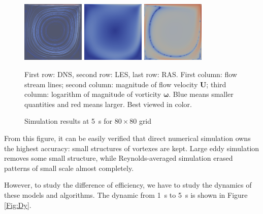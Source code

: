 \documentclass[english, nochinese]{pkupaper}
\begin{document}
\begin{figure}
{{
\includegraphics[width=3cm]{Results/Figure01h.pdf}
\includegraphics[width=3cm]{Results/Figure01g.pdf}
\includegraphics[width=3cm]{Results/Figure02o.pdf}
}
\caption{Simulation results at \SI{5}{s} for $ 80 \times 80 $ grid}
\label{Fig:Over}
}
{
\footnotesize
First row: DNS, second row: LES, last row: RAS. First column: flow stream lines; second column: magnitude of flow velocity $\mathbf{U}$; third column: logarithm of magnitude of vorticity $\bm{\omega}$. Blue means smaller quantities and red means larger. Best viewed in color.
}
\end{figure}

From this figure, it can be easily verified that direct numerical simulation owns the highest accuracy: small structures of vortexes are kept. Large eddy simulation removes some small structure, while Reynolds-averaged simulation erased patterns of small scale almost completely.

However, to study the difference of efficiency, we have to study the dynamics of these models and algorithms. The dynamic from \SI{1}{\second} to \SI{5}{\second} is shown in Figure \ref{Fig:Dy}.
\end{document}
